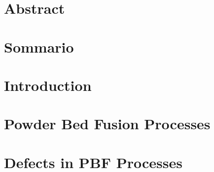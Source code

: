 \documentclass{Configuration_Files/PoliMi3i_thesis}
\begin{document}
\chapter*{Abstract}



\chapter*{Sommario}

\cleardoublepage



\mainmatter %



\chapter{Introduction}
\label{ch:Introduction}%



\chapter{Powder Bed Fusion Processes}
\label{ch:Metal_AM}



\chapter{Defects in PBF Processes}
\label{ch:defects}



\end{document}
